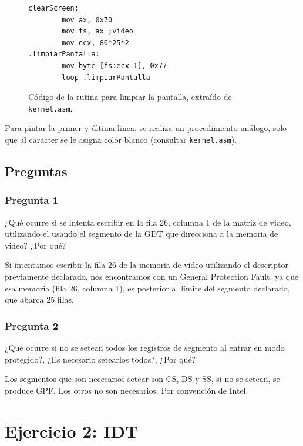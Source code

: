 \documentclass[10pt, a4paper]{article}
\begin{document}
\begin{figure}[!h]
\begin{center}
\begin{verbatim}
clearScreen:		
		mov ax, 0x70
		mov fs, ax ;video
		mov ecx, 80*25*2
.limpiarPantalla:
		mov byte [fs:ecx-1], 0x77
		loop .limpiarPantalla
\end{verbatim}
\caption{Código de la rutina para limpiar la pantalla, extraído de \texttt{kernel.asm}.}
\end{center}
\end{figure}
Para pintar la primer y última linea, se realiza un procedimiento análogo, solo que al caracter se le asigna color blanco (consultar \texttt{kernel.asm}). 
		
\subsection{Preguntas}
\subsubsection{Pregunta 1}
\begin{framed}
¿Qué ocurre si se intenta escribir en la fila 26, columna 1 de la matriz de video, utilizando el usando el segmento de la GDT que direcciona a la memoria de video?
¿Por qué?
\end{framed}
Si intentamos escribir la fila 26 de la memoria de video utilizando 
el descriptor previamente declarado, 
nos encontramos con un General Protection Fault, ya que esa 
memoria (fila 26, 
columna 1), es 
posterior al límite
 del segmento declarado, 
que abarca 25 filas.
\subsubsection*{Pregunta 2}
 \begin{framed}
¿Qué ocurre si no se setean todos los registros de segmento al entrar en modo protegido?, ¿Es necesario setearlos todos?, ¿Por qué?
\end{framed}
Los segmentos que son necesarios setear son CS, DS y SS, si no se setean, se produce GPF. Los otros no son necesarios. Por convención de Intel. %

\section{Ejercicio 2: IDT}
\end{document}
